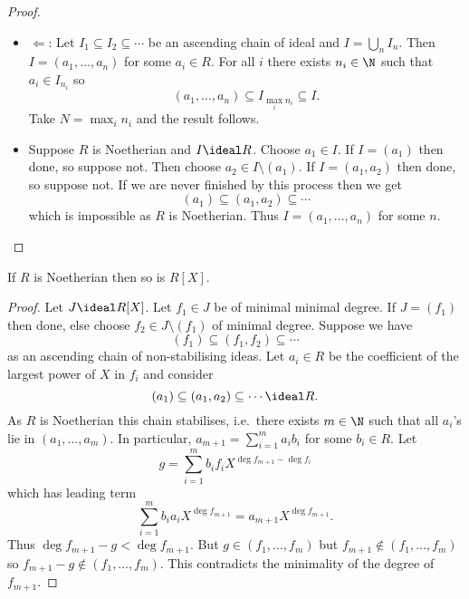 \documentclass[a4paper]{article}
\theoremstyle{definition}
\begin{document}
\begin{proof}\leavevmode
  \begin{itemize}
  \item \(\Leftarrow\): Let \(I_1 \subseteq I_2 \subseteq \cdots\) be an ascending chain of ideal and \(I = \bigcup_n I_n\). Then \(I = (a_1, \dots, a_n)\) for some \(a_i \in R\). For all \(i\) there exists \(n_i \in \N\) such that \(a_i \in I_{n_i}\) so
    \[
      (a_1, \dots, a_n) \subseteq I_{\max_i n_i} \subseteq I.
    \]
    Take \(N = \max_i n_i\) and the result follows.
  \item Suppose \(R\) is Noetherian and \(I \ideal R\). Choose \(a_1 \in I\). If \(I = (a_1)\) then done, so suppose not. Then choose \(a_2 \in I \setminus (a_1)\). If \(I = (a_1, a_2)\) then done, so suppose not. If we are never finished by this process then we get
    \[
      (a_1) \subseteq (a_1, a_2) \subseteq \cdots
    \]
    which is impossible as \(R\) is Noetherian. Thus \(I = (a_1, \dots, a_n)\) for some \(n\).
  \end{itemize}
\end{proof}

\begin{theorem}
  If \(R\) is Noetherian then so is \(R[X]\).
\end{theorem}

\begin{proof}
  Let \(J \ideal R[X]\). Let \(f_1 \in J\) be of minimal minimal degree. If \(J = (f_1)\) then done, else choose \(f_2 \in J \setminus (f_1)\) of minimal degree. Suppose we have
  \[
    (f_1) \subseteq (f_1, f_2) \subseteq \cdots 
  \]
  as an ascending chain of non-stabilising ideas. Let \(a_i \in R\) be the coefficient of the largest power of \(X\) in \(f_i\) and consider
  \[
    (a_1) \subseteq (a_1, a_2) \subseteq \cdots \ideal R.
  \]
  As \(R\) is Noetherian this chain stabilises, i.e.\ there exists \(m \in \N\) such that all \(a_i\)'s lie in \((a_1, \dots, a_m)\). In particular, \(a_{m + 1} = \sum_{i = 1}^m a_ib_i\) for some \(b_i \in R\). Let
  \[
    g = \sum_{i = 1}^m b_if_iX^{\deg f_{m + 1} - \deg f_i}
  \]
  which has leading term
  \[
    \sum_{i = 1}^m b_ia_iX^{\deg f_{m + 1}} = a_{m + 1}X^{\deg f_{m + 1}}.
  \]
  Thus \(\deg f_{m + 1} - g < \deg f_{m + 1}\). But \(g \in (f_1, \dots, f_m)\) but \(f_{m + 1} \notin (f_1, \dots, f_m)\) so \(f_{m + 1} - g \notin (f_1, \dots, f_m)\). This contradicts the minimality of the degree of \(f_{m + 1}\).
\end{proof}
\end{document}
